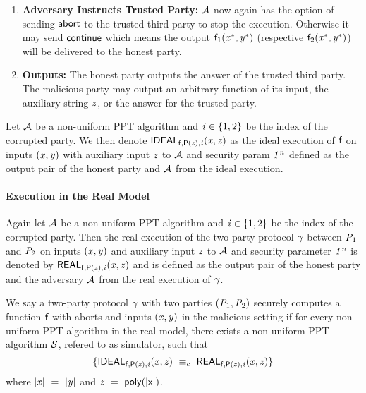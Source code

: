 \begin{enumerate}
    \item \textbf{Adversary Instructs Trusted Party:} $\mathcal{A}$ now again has the option of sending $\mathsf{abort}$ to the trusted third party to stop the execution.
    Otherwise it may send $\mathsf{continue}$ which means the output $\mathsf{f}_1(\mathit{x}^*, \mathit{y}^*)$ (respective $\mathsf{f}_2(\mathit{x}^*, \mathit{y}^*)$) will be delivered to the honest party.
    \item \textbf{Outputs:} The honest party outputs the answer of the trusted third party. The malicious party may output an arbitrary function of its input, the auxiliary string $\mathit{z}$, or the answer for the trusted party.
\end{enumerate}

Let $\mathcal{A}$ be a non-uniform PPT algorithm and $\mathit{i} \in \{1,2\}$ be the index of the corrupted party.
We then denote $\mathsf{IDEAL}_{\mathsf{f}, \mathsf{P}(\mathit{z}), \mathit{i}}(\mathit{x}, \mathit{z})$ as the ideal execution of $\mathsf{f}$ on inputs $(\mathit{x}, \mathit{y})$ with auxiliary input $\mathit{z}$ to $\mathcal{A}$ and security param $\mathit{1^n}$ defined as the output pair of the honest party and $\mathcal{A}$ from the ideal execution.

\paragraph{Execution in the Real Model} Again let $\mathcal{A}$ be a non-uniform PPT algorithm and $\mathit{i} \in \{1,2\}$ be the index of the corrupted party.
Then the real execution of the two-party protocol $\gamma$ between $\mathit{P}_{1}$ and $\mathit{P}_{2}$ on inputs $(\mathit{x}, \mathit{y})$ and auxiliary input $\mathit{z}$ to $\mathcal{A}$ and security parameter $\mathit{1^n}$ is denoted by $\mathsf{REAL}_{\mathsf{f}, \mathsf{P}(\mathit{z}), \mathit{i}}(\mathit{x}, \mathit{z})$ and is defined as the output pair of the honest party and the adversary $\mathcal{A}$ from the real execution of $\gamma$.

\begin{definition}
    We say a two-party protocol $\gamma$ with two parties $(\mathit{P}_{1}, \mathit{P}_{2})$ securely computes a function $\mathsf{f}$ with aborts and inputs $(\mathit{x}, \mathit{y})$ in the malicious setting if for every non-uniform PPT algorithm in the real model, there exists a non-uniform PPT algorithm $\mathcal{S}$, refered to as simulator, such that
    \[
        \{ \mathsf{IDEAL}_{\mathsf{f}, \mathsf{P}(\mathit{z}), \mathit{i}}(\mathit{x}, \mathit{z}) ~\equiv_{c}~ \mathsf{REAL}_{\mathsf{f}, \mathsf{P}(\mathit{z}), \mathit{i}}(\mathit{x}, \mathit{z}) \}
    \]
    where $|\mathit{x}| ~=~ |\mathit{y}|$ and $\mathit{z} ~=~ \mathsf{poly(|x|)}$.~\cite{lindell2017simulate}
\end{definition}

